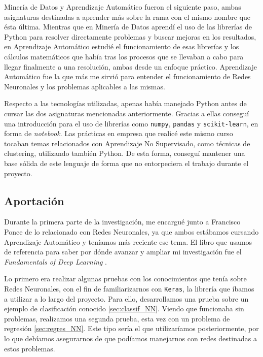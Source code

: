 Minería de Datos y Aprendizaje Automático fueron el siguiente paso, ambas asignaturas destinadas a aprender más sobre la rama con el mismo nombre que ésta última. Mientras que en Minería de Datos aprendí el uso de las librerías de Python para resolver directamente problemas y buscar mejoras en los resultados, en Aprendizaje Automático estudié el funcionamiento de esas librerías y los cálculos matemáticos que había tras los procesos que se llevaban a cabo para llegar finalmente a una resolución, ambas desde un enfoque práctico. Aprendizaje Automático fue la que más me sirvió para entender el funcionamiento de Redes Neuronales y los problemas aplicables a las mismas. 

Respecto a las tecnologías utilizadas, apenas había manejado Python antes de cursar las dos asignaturas mencionadas anteriormente. Gracias a ellas conseguí una introducción para el uso de librerías como \texttt{numpy}, \texttt{pandas} y \texttt{scikit-learn}, en forma de \textit{notebook}. Las prácticas en empresa que realicé este mismo curso tocaban temas relacionados con Aprendizaje No Supervisado, como técnicas de clustering, utilizando también Python. De esta forma, conseguí mantener una base sólida de este lenguaje de forma que no entorpeciera el trabajo durante el proyecto.

\subsection{Aportación}

Durante la primera parte de la investigación, me encargué junto a Francisco Ponce de lo relacionado con Redes Neuronales, ya que ambos estábamos cursando Aprendizaje Automático y teníamos más reciente ese tema. El libro que usamos de referencia para saber por dónde avanzar y ampliar mi investigación fue el \textit{Fundamentals of Deep Learning} \citep{Buduma:general}.

Lo primero era realizar algunas pruebas con los conocimientos que tenía sobre Redes Neuronales, con el fin de familiarizarnos con \texttt{Keras}, la librería que íbamos a utilizar a lo largo del proyecto. Para ello, desarrollamos una prueba sobre un ejemplo de clasificación conocido \ref{sec:classif_NN}. Viendo que funcionaba sin problemas, realizamos una segunda prueba, esta vez con un problema de regresión \ref{sec:regres_NN}. Este tipo sería el que utilizaríamos posteriormente, por lo que debíamos asegurarnos de que podíamos manejarnos con redes destinadas a estos problemas. 

